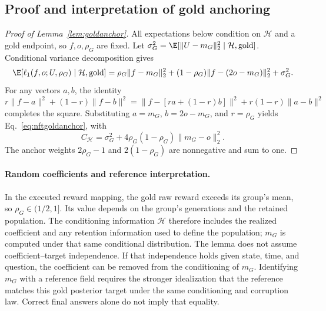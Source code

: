 \subsection{Proof and interpretation of gold anchoring}
\label{app:nftgoldproof}

\begin{proof}[Proof of Lemma~\ref{lem:goldanchor}]
All expectations below condition on $\mathcal H$ and a gold endpoint, so $f,o,\rho_G$ are fixed. Let $\sigma_G^2=\E[\|U-m_G\|_2^2\mid\mathcal H,\mathrm{gold}]$. Conditional variance decomposition gives
\begin{equation}
 \E[\ell_1(f,o;U,\rho_G)\mid\mathcal H,\mathrm{gold}]
 =\rho_G\|f-m_G\|_2^2
 +(1-\rho_G)\|f-(2o-m_G)\|_2^2+\sigma_G^2.
\end{equation}
For any vectors $a,b$, the identity $r\|f-a\|^2+(1-r)\|f-b\|^2=\|f-[ra+(1-r)b]\|^2+r(1-r)\|a-b\|^2$ completes the square. Substituting $a=m_G$, $b=2o-m_G$, and $r=\rho_G$ yields Eq.~\eqref{eq:nftgoldanchor}, with
\begin{equation}
 C_{\mathcal H}=\sigma_G^2+4\rho_G(1-\rho_G)\|m_G-o\|_2^2.
\end{equation}
The anchor weights $2\rho_G-1$ and $2(1-\rho_G)$ are nonnegative and sum to one.
\end{proof}

\paragraph{Random coefficients and reference interpretation.}
In the executed reward mapping, the gold raw reward exceeds its group's mean, so $\rho_G\in(1/2,1]$. Its value depends on the group's generations and the retained population. The conditioning information $\mathcal H$ therefore includes the realized coefficient and any retention information used to define the population; $m_G$ is computed under that same conditional distribution. The lemma does not assume coefficient--target independence. If that independence holds given state, time, and question, the coefficient can be removed from the conditioning of $m_G$. Identifying $m_G$ with a reference field requires the stronger idealization that the reference matches this gold posterior target under the same conditioning and corruption law. Correct final answers alone do not imply that equality.

